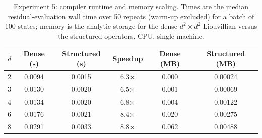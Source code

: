 \begin{table}[ht]
\centering
\caption{Experiment 5: compiler runtime and memory scaling. Times are the median residual-evaluation wall time over 50 repeats (warm-up excluded) for a batch of 100 states; memory is the analytic storage for the dense $d^2\times d^2$ Liouvillian versus the structured operators. CPU, single machine.}
\label{tab:exp5}
\begin{tabular}{lccccc}
\toprule
$d$ & Dense (s) & Structured (s) & Speedup & Dense (MB) & Structured (MB) \\
\midrule
2 & 0.0094 & 0.0015 & 6.3$\times$ & 0.000 & 0.00024 \\
3 & 0.0130 & 0.0020 & 6.5$\times$ & 0.001 & 0.00069 \\
4 & 0.0134 & 0.0020 & 6.8$\times$ & 0.004 & 0.00122 \\
6 & 0.0176 & 0.0021 & 8.4$\times$ & 0.020 & 0.00275 \\
8 & 0.0291 & 0.0033 & 8.8$\times$ & 0.062 & 0.00488 \\
\bottomrule
\end{tabular}
\end{table}
